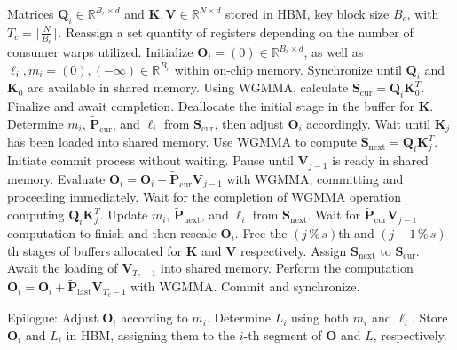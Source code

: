 \begin{algorithm}[H]
    \caption{\small\label{alg:flash3_wgmma}\textsc{FlashAttention-3} consumer warpgroup forward pass}
    \begin{algorithmic}[1]
      \REQUIRE  Matrices $\mathbf{Q}_i \in \mathbb{R}^{B_r \times d}$ and $\mathbf{K}, \mathbf{V} \in \mathbb{R}^{N \times d}$ stored in HBM, key block size $B_c$, with $T_c = \lceil \frac{N}{B_c} \rceil$.
      \STATE Reassign a set quantity of registers depending on the number of consumer warps utilized.
      \STATE Initialize $\mathbf{O}_i = (0) \in \mathbb{R}^{B_r \times d}$, as well as $\ell_i, m_i = (0), (-\infty) \in \mathbb{R}^{B_r}$ within on-chip memory.
      \STATE Synchronize until $\mathbf{Q}_i$ and $\mathbf{K}_0$ are available in shared memory.
      \STATE Using WGMMA, calculate $\mathbf{S}_{\mathrm{cur}} = \mathbf{Q}_i \mathbf{K}_0^T$. Finalize and await completion.
      \STATE Deallocate the initial stage in the buffer for $\mathbf{K}$.
      \STATE Determine $m_{i}$, $\tilde{\mathbf{P}}_{\mathrm{cur}}$, and $\ell_{i}$ from $\mathbf{S}_{\mathrm{cur}}$, then adjust $\mathbf{O}_i$ accordingly.
        \STATE Wait until $\mathbf{K}_j$ has been loaded into shared memory.
        \label{code:mainloop_start}
        \STATE Use WGMMA to compute $\mathbf{S}_{\mathrm{next}} = \mathbf{Q}_i \mathbf{K}_{j}^T$. Initiate commit process without waiting. \label{code:first_wgmma}
        \STATE Pause until $\mathbf{V}_{j-1}$ is ready in shared memory.
        \STATE Evaluate $\mathbf{O}_{i} = \mathbf{O}_{i} + \tilde{\mathbf{P}}_{\mathrm{cur}} \mathbf{V}_{j-1}$ with WGMMA, committing and proceeding immediately. \label{code:second_wgmma}
        \STATE Wait for the completion of WGMMA operation computing $\mathbf{Q}_i \mathbf{K}_{j}^T$.
        \STATE Update $m_{i}$, $\tilde{\mathbf{P}}_{\mathrm{next}}$, and $\ell_{i}$ from $\mathbf{S}_{\mathrm{next}}$. \label{code:softmax}
        \STATE Wait for $\tilde{\mathbf{P}}_{\mathrm{cur}} \mathbf{V}_{j-1}$ computation to finish and then rescale $\mathbf{O}_i$.
        \STATE Free the $(j\,\%\,s)$th and $(j-1\,\%\,s)$th stages of buffers allocated for $\mathbf{K}$ and $\mathbf{V}$ respectively.
        \STATE Assign $\mathbf{S}_{\mathrm{next}}$ to $\mathbf{S}_{\mathrm{cur}}$.
        \label{code:mainloop_end}
      \ENDFOR \STATE Await the loading of $\mathbf{V}_{T_c - 1}$ into shared memory.
      \STATE Perform the computation
      $\mathbf{O}_{i} = \mathbf{O}_{i} + \tilde{\mathbf{P}}_{\mathrm{last}} \mathbf{V}_{T_c - 1}$ with WGMMA. Commit and synchronize.

\STATE Epilogue: Adjust $\mathbf{O}_{i}$ according to $m_{i}$. Determine $L_{i}$ using both $m_{i}$ and $\ell_{i}$.
Store $\mathbf{O}_{i}$ and $L_{i}$ in HBM, assigning them to the $i$-th segment of $\mathbf{O}$ and $L$, respectively.
\end{algorithmic}
\end{algorithm}

